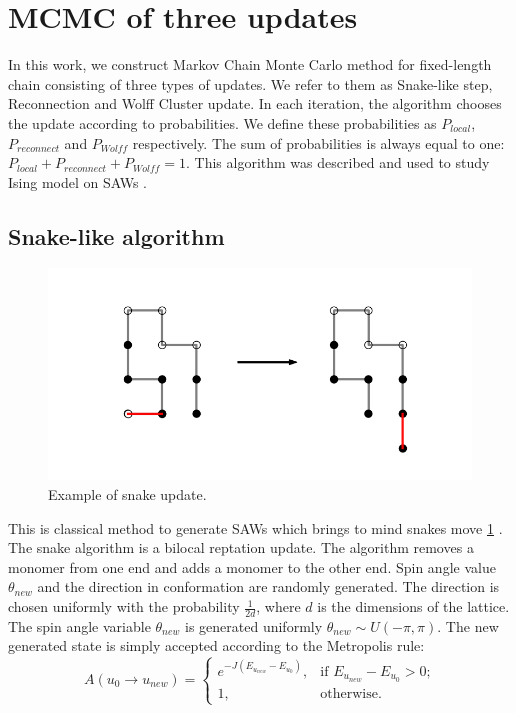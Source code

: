 \section{MCMC of three updates}
In this work, we construct Markov Chain Monte Carlo method for fixed-length chain consisting of three types of updates. We refer to them as Snake-like step, Reconnection and Wolff Cluster update. In each iteration, the algorithm chooses the update according to probabilities. We define these probabilities as $P_{local}$,$P_{reconnect}$ and $P_{Wolff}$ respectively. The sum of probabilities is always equal to one: $P_{local} + P_{reconnect} + P_{Wolff} = 1$. This algorithm was described and used to study Ising model on SAWs \cite{PhysRevE.104.054501}. 

\subsection{Snake-like algorithm}
 \begin{figure} 
	\centering
	\includegraphics[scale=0.2]{Images/snakeupdate.png} 
	\captionsetup{justification=centering} \caption{ Example of snake update. }
	\label{fig:snake}
\end{figure}
This is classical method to generate SAWs which brings to mind snakes move \ref{fig:snake}  \cite{Binder2010}. The snake algorithm is a bilocal reptation update. The algorithm removes a monomer from one end and adds a monomer to the other end. Spin angle value $\theta_{new}$ and the direction in conformation are randomly generated. The direction is chosen uniformly with the probability $\frac{1}{2d}$, where $d$ is the dimensions of the lattice. The spin angle variable $\theta_{new}$ is generated uniformly $\theta_{new} \sim U(-\pi, \pi)$. The new generated state is simply accepted  according to the Metropolis rule:
\begin{equation}
\label{accratios}
A(u_0  \rightarrow u_{new} ) =  
\begin{cases}
e^{-J(E_{u_{new}}-E_{u_0})}, & \text{if $E_{u_{new}}-E_{u_0}>0$;}\\
1, & \text{otherwise}.
\end{cases}
\end{equation}

